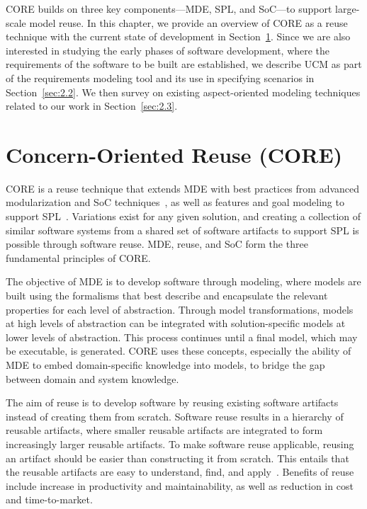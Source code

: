 CORE builds on three key components---MDE, SPL, and SoC---to support large-scale model reuse. In this chapter, we provide an overview of CORE as a reuse technique with the current state of development in Section~\ref{sec:2.1}. Since we are also interested in studying the early phases of software development, where the requirements of the software to be built are established, we describe UCM as part of the requirements modeling tool and its use in specifying scenarios in Section~\ref{sec:2.2}. We then survey on existing aspect-oriented modeling techniques related to our work in Section~\ref{sec:2.3}.

\section{Concern-Oriented Reuse (CORE)} \label{sec:2.1}

CORE is a reuse technique that extends MDE with best practices from advanced modularization and SoC techniques~\cite{dijkstra1976discipline}, as well as features and goal modeling to support SPL~\cite{pohl2005software}. Variations exist for any given solution, and creating a collection of similar software systems from a shared set of software artifacts to support SPL is possible through software reuse. MDE, reuse, and SoC form the three fundamental principles of CORE.

The objective of MDE is to develop software through modeling, where models are built using the formalisms that best describe and encapsulate the relevant properties for each level of abstraction. Through model transformations, models at high levels of abstraction can be integrated with solution-specific models at lower levels of abstraction. This process continues until a final model, which may be executable, is generated. CORE uses these concepts, especially the ability of MDE to embed domain-specific knowledge into models, to bridge the gap between domain and system knowledge.

The aim of reuse is to develop software by reusing existing software artifacts instead of creating them from scratch. Software reuse results in a hierarchy of reusable artifacts, where smaller reusable artifacts are integrated to form increasingly larger reusable artifacts. To make software reuse applicable, reusing an artifact should be easier than constructing it from scratch. This entails that the reusable artifacts are easy to understand, find, and apply~\cite{coulange2012software, krueger1992software}. Benefits of reuse include increase in productivity and maintainability, as well as reduction in cost and time-to-market.

